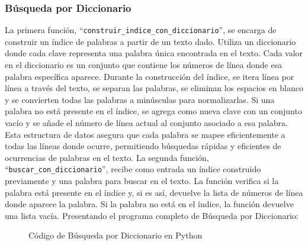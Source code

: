 \documentclass[12pt, twoside]{article}
\begin{document}
\subsubsection{Búsqueda por Diccionario }
La primera función, ``\texttt{construir\_indice\_con\_diccionario}'',  se encarga de construir un índice de palabras a partir de un texto dado. Utiliza un diccionario donde cada clave representa una palabra única encontrada en el texto. Cada valor en el diccionario es un conjunto que contiene los números de línea donde esa palabra específica aparece. Durante la construcción del índice, se itera línea por línea a través del texto, se separan las palabras, se eliminan los espacios en blanco y se convierten todas las palabras a minúsculas para normalizarlas. Si una palabra no está presente en el índice, se agrega como nueva clave con un conjunto vacío y se añade el número de línea actual al conjunto asociado a esa palabra. Esta estructura de datos asegura que cada palabra se mapee eficientemente a todas las líneas donde ocurre, permitiendo búsquedas rápidas y eficientes de ocurrencias de palabras en el texto.
\newline
\newline
La segunda función, ``\texttt{buscar\_con\_diccionario}'', recibe como entrada un índice construido previamente y una palabra para buscar en el texto. La función verifica si la palabra está presente en el índice y, si es así, devuelve la lista de números de línea donde aparece la palabra. Si la palabra no está en el índice, la función devuelve una lista vacía.
\newline
\newline
Presentando el programa completo de Búsqueda por Diccionario:
\begin{figure}[H]
  \centering
  
  \caption{Código de Búsqueda por Diccionario en Python}
  \label{fig:codigo-tabla-hash}
\end{figure}
\end{document}
